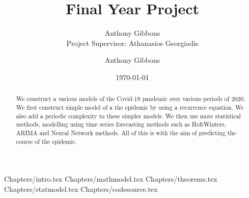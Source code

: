 \documentclass[a4paper]{article}
\title{Final Year Project}
\author{Anthony Gibbons \qquad 17322353 \\ Project Supervisor: Athanasios Georgiadis}
\author{Anthony Gibbons}
\date{\today}
\begin{document}
\maketitle      

\begin{abstract}
    We construct a various models of the Covid-19 pandemic over various periods of 2020. We first construct simple model of a the epidemic by using a recurrence equation. We also add a periodic complexity to these simpler models. We then use more statistical methods, modelling using time series forecasting methods such as HoltWinters, ARIMA and Neural Network methods. All of this is with the aim of predicting the course of the epidemic.
\end{abstract}
\hypersetup{
    linkcolor=blue,
}
{Chapters/intro.tex}
{Chapters/mathmodel.tex}
{Chapters/theorems.tex}
{Chapters/statmodel.tex}
{Chapters/codesource.tex}
\pagebreak 
\printbibliography
\end{document}
